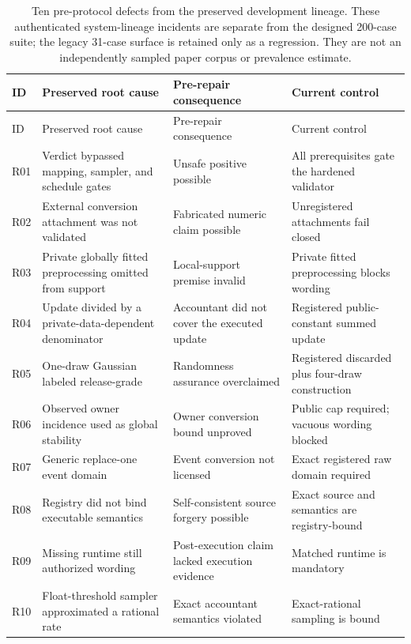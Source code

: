 \begin{longtable}{p{}p{}p{}p{}}
\caption{Ten pre-protocol defects from the preserved development lineage. These authenticated system-lineage incidents are separate from the designed 200-case suite; the legacy 31-case surface is retained only as a regression. They are not an independently sampled paper corpus or prevalence estimate.}\label{tab:v5-retrospective}\\
\hline
ID & Preserved root cause & Pre-repair consequence & Current control \\
\hline
\endfirsthead
\hline
ID & Preserved root cause & Pre-repair consequence & Current control \\
\hline
\endhead
R01 & Verdict bypassed mapping, sampler, and schedule gates & Unsafe positive possible & All prerequisites gate the hardened validator \\
R02 & External conversion attachment was not validated & Fabricated numeric claim possible & Unregistered attachments fail closed \\
R03 & Private globally fitted preprocessing omitted from support & Local-support premise invalid & Private fitted preprocessing blocks wording \\
R04 & Update divided by a private-data-dependent denominator & Accountant did not cover the executed update & Registered public-constant summed update \\
R05 & One-draw Gaussian labeled release-grade & Randomness assurance overclaimed & Registered discarded plus four-draw construction \\
R06 & Observed owner incidence used as global stability & Owner conversion bound unproved & Public cap required; vacuous wording blocked \\
R07 & Generic replace-one event domain & Event conversion not licensed & Exact registered raw domain required \\
R08 & Registry did not bind executable semantics & Self-consistent source forgery possible & Exact source and semantics are registry-bound \\
R09 & Missing runtime still authorized wording & Post-execution claim lacked execution evidence & Matched runtime is mandatory \\
R10 & Float-threshold sampler approximated a rational rate & Exact accountant semantics violated & Exact-rational sampling is bound \\
\hline
\end{longtable}
